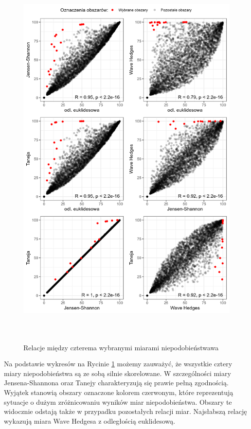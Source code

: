 \documentclass{amuthesis}
\begin{document}
\begin{figure}[t]

{\centering \includegraphics[width=5.20833in,height=7.8125in]{figures/relacje_miar1.png}

}

\caption{\label{fig-relacje_miar1}Relacje między czterema wybranymi
miarami niepodobieństwawa}

\end{figure}

Na podstawie wykresów na Rycinie \ref{fig-relacje_miar1} możemy
zauważyć, że wszystkie cztery miary niepodobieństwa są ze sobą silnie
skorelowane. W szczególności miary Jensena-Shannona oraz Tanejy
charakteryzują się prawie pełną zgodnością. Wyjątek stanowią obszary
oznaczone kolorem czerwonym, które reprezentują sytuacje o dużym
zróżnicowaniu wyników miar niepodobieństwa. Obszary te widocznie odstają
także w przypadku pozostałych relacji miar. Najsłabszą relację wykazują
miara Wave Hedgesa z odległością euklidesową.
\end{document}
